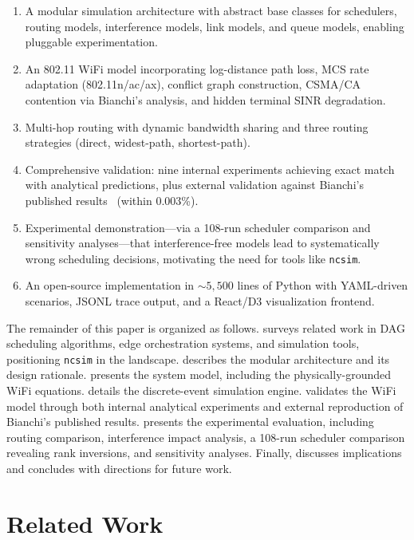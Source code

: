 \documentclass[conference]{IEEEtran}
\newcommand{\ncsim}{\texttt{ncsim}}
\begin{document}
\begin{enumerate}[itemsep=2pt,leftmargin=*]
\item A modular simulation architecture with abstract base classes for
  schedulers, routing models, interference models, link models, and queue
  models, enabling pluggable experimentation.
\item An 802.11 WiFi model incorporating log-distance path loss, MCS rate
  adaptation (802.11n/ac/ax), conflict graph construction, CSMA/CA contention
  via Bianchi's analysis, and hidden terminal SINR degradation.
\item Multi-hop routing with dynamic bandwidth sharing and three routing
  strategies (direct, widest-path, shortest-path).
\item Comprehensive validation: nine internal experiments achieving exact
  match with analytical predictions, plus external validation against
  Bianchi's published results~\cite{bianchi2000} (within 0.003\%).
\item Experimental demonstration---via a 108-run scheduler comparison
  and sensitivity analyses---that interference-free models lead to
  systematically wrong scheduling decisions, motivating the need for
  tools like \ncsim{}.
\item An open-source implementation in ${\sim}5{,}500$ lines of Python with
  YAML-driven scenarios, JSONL trace output, and a React/D3 visualization
  frontend.
\end{enumerate}

The remainder of this paper is organized as follows.
 surveys related work in DAG scheduling algorithms,
edge orchestration systems, and simulation tools, positioning \ncsim{} in
the landscape.   describes the modular architecture and its design
rationale.   presents the system model, including the
physically-grounded WiFi equations.   details the
discrete-event simulation engine.   validates the WiFi
model through both internal analytical experiments and external reproduction
of Bianchi's published results.   presents the experimental
evaluation, including routing comparison, interference impact analysis,
a 108-run scheduler comparison revealing rank inversions, and sensitivity
analyses.  Finally,  discusses implications and concludes with
directions for future work.


\section{Related Work}
\label{sec:related}
\end{document}
